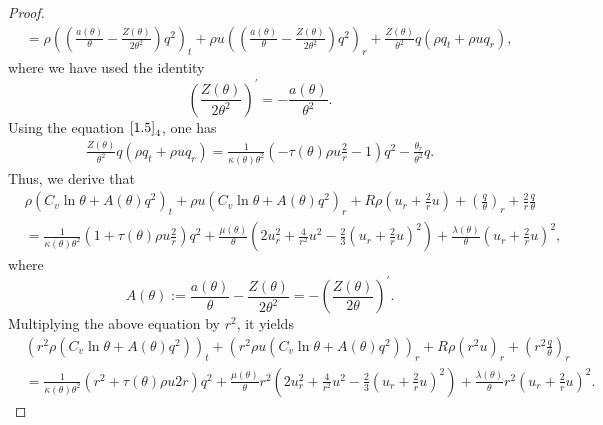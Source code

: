 \documentclass[11pt,reqno]{amsart}
\numberwithin{equation}{section}
\begin{document}
\begin{proof}
\begin{align*}
&=\rho \left( \left(\frac{a(\theta)}{\theta}-\frac{Z(\theta)}{2\theta^2}\right) q^2\right)_t+\rho u \left(  \left(\frac{a(\theta)}{\theta}-\frac{Z(\theta)}{2\theta^2}\right) q^2\right)_r+\frac{Z(\theta)}{\theta^2} q (\rho q_t+\rho u q_r),
\end{align*}
where we have used the identity
$$
\left(\frac{Z(\theta)}{2\theta^2}\right)^\prime =-\frac{a(\theta)}{\theta^2}.
$$
Using the equation $\eqref{1.5}_4$, one has
\begin{align*}
\frac{Z(\theta)}{\theta^2} q (\rho q_t+\rho u q_r)
=\frac{1}{\kappa(\theta)\theta^2} \left( -\tau(\theta) \rho u \frac{2}{r}-1\right)q^2-\frac{\theta_r}{\theta^2} q.
\end{align*}
Thus, we derive that
{\small
\begin{align*}
&\rho( C_v \ln \theta +A(\theta) q^2 )_t+\rho u (C_v \ln \theta+A(\theta) q^2)_r+R \rho (u_r+\frac{2}{r} u)+\left(\frac{q}{\theta}\right)_r+\frac{2}{r} \frac{q}{\theta}\\
&=\frac{1}{\kappa(\theta) \theta^2} \left(1+\tau(\theta) \rho u \frac{2}{r}\right) q^2+ \frac{\mu(\theta)}{\theta} \left( 2u_r^2+\frac{4}{r^2}u^2-\frac{2}{3} \left(u_r+\frac{2}{r} u\right)^2\right)+ \frac{\lambda(\theta)}{\theta} \left(u_r+\frac{2}{r} u\right)^2,
\end{align*}
}
where
\[
A(\theta):=\frac{a(\theta)}{\theta}-\frac{Z(\theta)}{2\theta^2}=-\left(\frac{Z(\theta)}{2\theta}\right)^\prime.
\]
Multiplying the above equation by $r^2$, it yields{\small
\begin{align*}
&\left( r^2 \rho \left( C_v \ln \theta +A(\theta) q^2 \right)\right)_t+\left( r^2 \rho u \left( C_v \ln \theta +A(\theta) q^2 \right)\right)_r+R \rho (r^2 u)_r+\left( r^2 \frac{q}{\theta}\right)_r\\
&=\frac{1}{\kappa(\theta) \theta^2} \left(r^2+\tau(\theta) \rho u 2 r \right) q^2+ \frac{\mu(\theta)}{\theta} r^2 \left( 2u_r^2+\frac{4}{r^2}u^2-\frac{2}{3} \left(u_r+\frac{2}{r} u\right)^2\right)+ \frac{\lambda(\theta)}{\theta} r^2 \left(u_r+\frac{2}{r} u\right)^2.
\end{align*}}

\end{proof}
\end{document}

